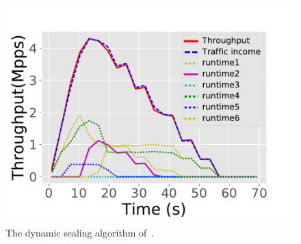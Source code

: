 
\begin{figure}[!h]
	\centering
	\includegraphics[width=\columnwidth]{figure/Scale.pdf}
	\caption{The dynamic scaling algorithm of~\nfactor.}
\label{fig:normal-case-eval}
\end{figure}


